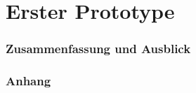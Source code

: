 \documentclass[a4paper,11pt]{article}
\begin{document}



\newpage
\renewcommand{\contentsname}{Inhaltsverzeichnis}
\tableofcontents
\clearpage





\newpage
\part{Erster Prototype}






\newpage
\section{Zusammenfassung und Ausblick} \label{ende-sec}



\newpage 
\renewcommand{\listfigurename}{Abbildungsverzeichnis}
\listoffigures


\newpage
\renewcommand{\listtablename}{Tabellenverzeichnis}
\listoftables


\newpage
\section*{Anhang}


\newpage


\end{document}
